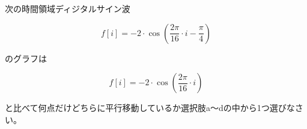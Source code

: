 次の時間領域ディジタルサイン波 

\[
f[i] = -2 \cdot \cos \left ( \frac{2 \pi}{16}  \cdot i - \frac{\pi}{4} \right )
\]

\noindent のグラフは

\[
f[i] = -2 \cdot \cos \left ( \frac{2 \pi}{16}  \cdot i \right )
\]

\noindent と比べて何点だけどちらに平行移動しているか選択肢a〜dの中から1つ選びなさい。
